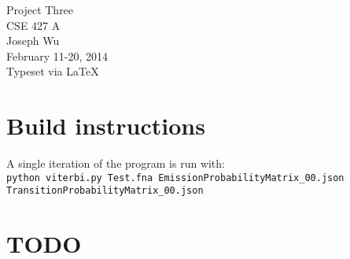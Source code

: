 \documentclass[a4paper, 12pt]{report}
\begin{document}
    \begin{center}
        {\LARGE Project Three} \\
        CSE 427 A \\
        Joseph Wu  \\
        February 11-20, 2014 \\
        {\tiny Typeset via \LaTeX}
    \end{center}

\section{Build instructions}
    A single iteration of the program is run with: \\
    \texttt{python viterbi.py Test.fna EmissionProbabilityMatrix\_00.json TransitionProbabilityMatrix\_00.json}

\section{TODO}
    
    
\end{document}
